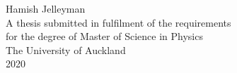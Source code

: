 \documentclass[../main.tex]{subfiles}
\begin{document}
\begin{titlepage} \vspace{20mm} \centering
{\Huge\textbf{}\par}  \vspace{20mm} {\Large Hamish Jelleyman} \vspace{20mm} \\ \vspace{20mm} A thesis submitted in fulfilment of the requirements \\ for the degree of Master of Science in Physics \\ \vspace{20mm} The University of Auckland \\ 2020
\end{titlepage}



\tableofcontents
\end{document}
